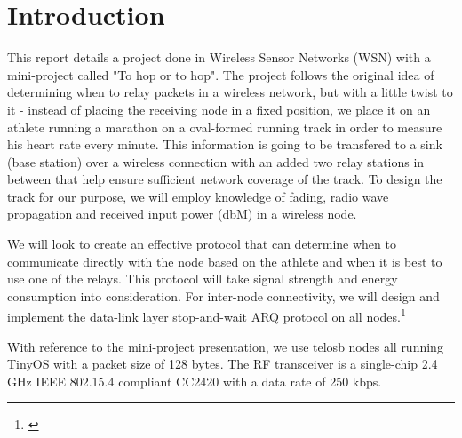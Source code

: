 \chapter{Introduction}\label{ch:introduction}

This report details a project done in Wireless Sensor Networks (WSN) with a mini-project called "To hop or to hop". The project follows the original idea of determining when to relay packets in a wireless network, but with a little twist to it - instead of placing the receiving node in a fixed position, we place it on an athlete running a marathon on a oval-formed running track in order to measure his heart rate every minute. This information is going to be transfered to a sink (base station) over a wireless connection with an added two relay stations in between that help ensure sufficient network coverage of the track. To design the track for our purpose, we will employ knowledge of fading, radio wave propagation and received input power (dbM) in a wireless node.

\noindent We will look to create an effective protocol that can determine when to communicate directly with the node based on the athlete and when it is best to use one of the relays. This protocol will take signal strength and energy consumption into consideration. For inter-node connectivity, we will design and implement the data-link layer stop-and-wait ARQ protocol on all nodes.\footnote{\cite{Ieee}}

\noindent With reference to the mini-project presentation, we use telosb nodes all running TinyOS with a packet size of 128 bytes. The RF transceiver is a single-chip 2.4 GHz IEEE 802.15.4 compliant CC2420 with a data rate of 250 kbps.






